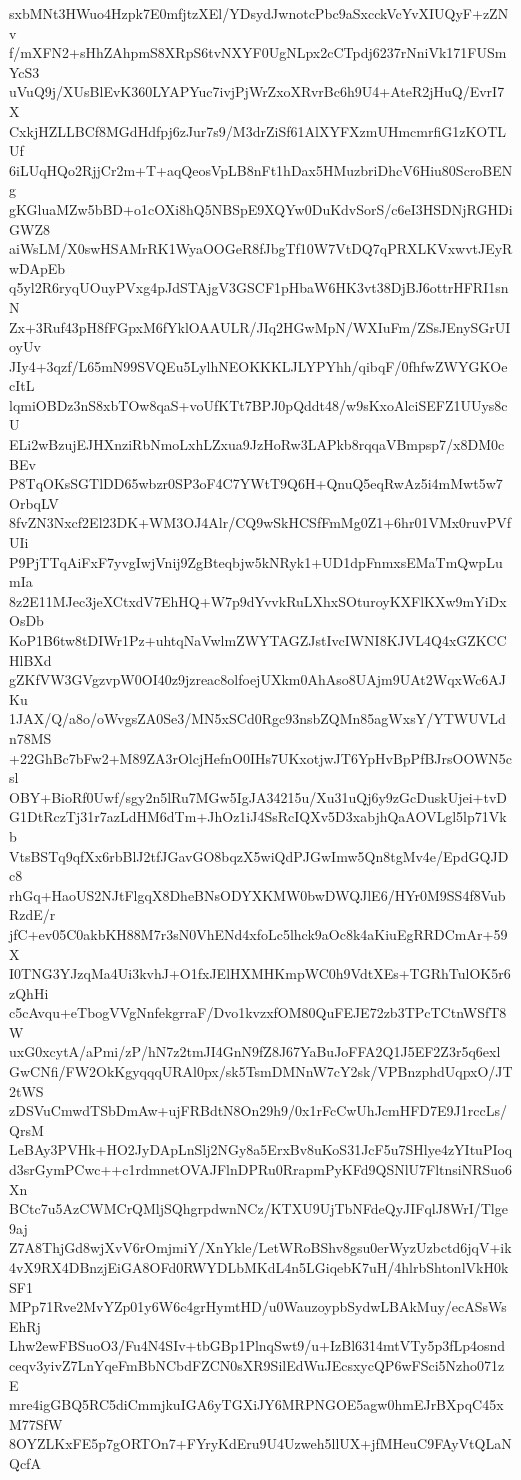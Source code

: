 sxbMNt3HWuo4Hzpk7E0mfjtzXEl/YDsydJwnotcPbc9aSxcckVcYvXIUQyF+zZNv
f/mXFN2+sHhZAhpmS8XRpS6tvNXYF0UgNLpx2cCTpdj6237rNniVk171FUSmYcS3
uVuQ9j/XUsBlEvK360LYAPYuc7ivjPjWrZxoXRvrBc6h9U4+AteR2jHuQ/EvrI7X
CxkjHZLLBCf8MGdHdfpj6zJur7s9/M3drZiSf61AlXYFXzmUHmcmrfiG1zKOTLUf
6iLUqHQo2RjjCr2m+T+aqQeosVpLB8nFt1hDax5HMuzbriDhcV6Hiu80ScroBENg
gKGluaMZw5bBD+o1cOXi8hQ5NBSpE9XQYw0DuKdvSorS/c6eI3HSDNjRGHDiGWZ8
aiWsLM/X0swHSAMrRK1WyaOOGeR8fJbgTf10W7VtDQ7qPRXLKVxwvtJEyRwDApEb
q5yl2R6ryqUOuyPVxg4pJdSTAjgV3GSCF1pHbaW6HK3vt38DjBJ6ottrHFRI1snN
Zx+3Ruf43pH8fFGpxM6fYklOAAULR/JIq2HGwMpN/WXIuFm/ZSsJEnySGrUIoyUv
JIy4+3qzf/L65mN99SVQEu5LylhNEOKKKLJLYPYhh/qibqF/0fhfwZWYGKOecItL
lqmiOBDz3nS8xbTOw8qaS+voUfKTt7BPJ0pQddt48/w9sKxoAlciSEFZ1UUys8cU
ELi2wBzujEJHXnziRbNmoLxhLZxua9JzHoRw3LAPkb8rqqaVBmpsp7/x8DM0cBEv
P8TqOKsSGTlDD65wbzr0SP3oF4C7YWtT9Q6H+QnuQ5eqRwAz5i4mMwt5w7OrbqLV
8fvZN3Nxcf2El23DK+WM3OJ4Alr/CQ9wSkHCSfFmMg0Z1+6hr01VMx0ruvPVfUIi
P9PjTTqAiFxF7yvgIwjVnij9ZgBteqbjw5kNRyk1+UD1dpFnmxsEMaTmQwpLumIa
8z2E11MJec3jeXCtxdV7EhHQ+W7p9dYvvkRuLXhxSOturoyKXFlKXw9mYiDxOsDb
KoP1B6tw8tDIWr1Pz+uhtqNaVwlmZWYTAGZJstIvcIWNI8KJVL4Q4xGZKCCHlBXd
gZKfVW3GVgzvpW0OI40z9jzreac8olfoejUXkm0AhAso8UAjm9UAt2WqxWc6AJKu
1JAX/Q/a8o/oWvgsZA0Se3/MN5xSCd0Rgc93nsbZQMn85agWxsY/YTWUVLdn78MS
+22GhBc7bFw2+M89ZA3rOlcjHefnO0IHs7UKxotjwJT6YpHvBpPfBJrsOOWN5csl
OBY+BioRf0Uwf/sgy2n5lRu7MGw5IgJA34215u/Xu31uQj6y9zGcDuskUjei+tvD
G1DtRczTj31r7azLdHM6dTm+JhOz1iJ4SsRcIQXv5D3xabjhQaAOVLgl5lp71Vkb
VtsBSTq9qfXx6rbBlJ2tfJGavGO8bqzX5wiQdPJGwImw5Qn8tgMv4e/EpdGQJDc8
rhGq+HaoUS2NJtFlgqX8DheBNsODYXKMW0bwDWQJlE6/HYr0M9SS4f8VubRzdE/r
jfC+ev05C0akbKH88M7r3sN0VhENd4xfoLc5lhck9aOc8k4aKiuEgRRDCmAr+59X
I0TNG3YJzqMa4Ui3kvhJ+O1fxJElHXMHKmpWC0h9VdtXEs+TGRhTulOK5r6zQhHi
c5cAvqu+eTbogVVgNnfekgrraF/Dvo1kvzxfOM80QuFEJE72zb3TPcTCtnWSfT8W
uxG0xcytA/aPmi/zP/hN7z2tmJI4GnN9fZ8J67YaBuJoFFA2Q1J5EF2Z3r5q6exl
GwCNfi/FW2OkKgyqqqURAl0px/sk5TsmDMNnW7cY2sk/VPBnzphdUqpxO/JT2tWS
zDSVuCmwdTSbDmAw+ujFRBdtN8On29h9/0x1rFcCwUhJcmHFD7E9J1rccLs/QrsM
LeBAy3PVHk+HO2JyDApLnSlj2NGy8a5ErxBv8uKoS31JcF5u7SHlye4zYItuPIoq
d3srGymPCwc++c1rdmnetOVAJFlnDPRu0RrapmPyKFd9QSNlU7FltnsiNRSuo6Xn
BCtc7u5AzCWMCrQMljSQhgrpdwnNCz/KTXU9UjTbNFdeQyJIFqlJ8WrI/Tlge9aj
Z7A8ThjGd8wjXvV6rOmjmiY/XnYkle/LetWRoBShv8gsu0erWyzUzbctd6jqV+ik
4vX9RX4DBnzjEiGA8OFd0RWYDLbMKdL4n5LGiqebK7uH/4hlrbShtonlVkH0kSF1
MPp71Rve2MvYZp01y6W6c4grHymtHD/u0WauzoypbSydwLBAkMuy/ecASsWsEhRj
Lhw2ewFBSuoO3/Fu4N4SIv+tbGBp1PlnqSwt9/u+IzBl6314mtVTy5p3fLp4osnd
ceqv3yivZ7LnYqeFmBbNCbdFZCN0sXR9SilEdWuJEcsxycQP6wFSci5Nzho071zE
mre4igGBQ5RC5diCmmjkuIGA6yTGXiJY6MRPNGOE5agw0hmEJrBXpqC45xM77SfW
8OYZLKxFE5p7gORTOn7+FYryKdEru9U4Uzweh5llUX+jfMHeuC9FAyVtQLaNQcfA
